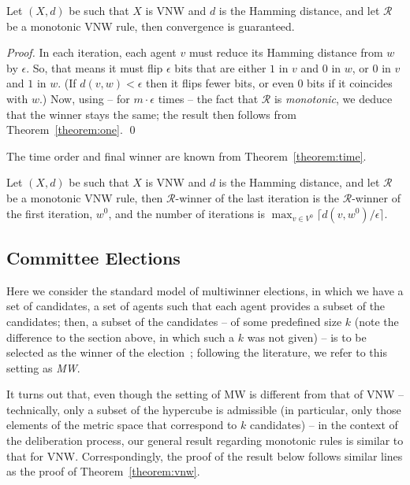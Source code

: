 \documentclass[runningheads,envcountsame]{llncs}
\begin{document}
\begin{theorem}\label{theorem:vnw}
  Let $(X, d)$ be such that $X$ is VNW and $d$ is the Hamming distance, and let $\mathcal{R}$ be a monotonic VNW rule, then convergence is guaranteed.
\end{theorem}
\begin{proof}
%
In each iteration, each agent $v$ must reduce its Hamming distance from $w$ by $\epsilon$. So, that means it must flip $\epsilon$ bits that are either $1$ in $v$ and $0$ in $w$, or $0$ in $v$ and $1$ in $w$. (If $d(v,w)<\epsilon$ then it flips fewer bits, or even 0 bits if it coincides with $w$.)
%
Now, using -- for $m\cdot\epsilon$ times -- the fact that $\mathcal{R}$ is \emph{monotonic}, we deduce that the winner stays the same; the result then follows from Theorem~\ref{theorem:one}.
%
\qed\end{proof}

The time order and final winner are known from Theorem~\ref{theorem:time}.

\begin{corollary}
  Let $(X, d)$ be such that $X$ is VNW and $d$ is the Hamming distance, and let $\mathcal{R}$ be a monotonic VNW rule, then $\mathcal{R}$-winner of the last iteration is the $\mathcal{R}$-winner of the first iteration, $w^0$, and the number of iterations is $\max_{v \in V^0} \lceil d(v, w^0)/\epsilon\rceil$.
\end{corollary}


\subsection{Committee Elections}

Here we consider the standard model of multiwinner elections, in which we have a set of candidates, a set of agents such that each agent provides a subset of the candidates; then, a subset of the candidates -- of some predefined size $k$ (note the difference to the section above, in which such a $k$ was not given) -- is to be selected as the winner of the election~\cite{mwchapter}; following the literature, we refer to this setting as \emph{MW}.

It turns out that, even though the setting of MW is different from that of VNW -- technically, only a subset of the hypercube is admissible (in particular, only those elements of the metric space that correspond to $k$ candidates) -- in the context of the deliberation process, our general result regarding monotonic rules is similar to that for VNW.
%
Correspondingly, the proof of the result below follows similar lines as the proof of Theorem~\ref{theorem:vnw}.
\end{document}
